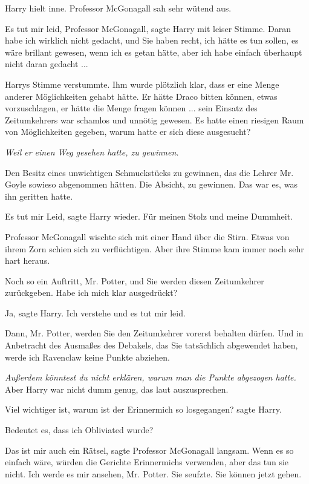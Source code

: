 Harry hielt inne. Professor McGonagall sah sehr wütend aus.

\glqq{}Es tut mir leid, Professor McGonagall\grqq{}, sagte Harry mit leiser
Stimme. \glqq{}Daran habe ich wirklich nicht gedacht, und Sie haben recht, ich
hätte es tun sollen, es wäre brillant gewesen, wenn ich es getan hätte, aber ich
habe einfach überhaupt nicht daran gedacht ...\grqq{}

Harrys Stimme verstummte. Ihm wurde plötzlich klar, dass er eine Menge anderer
Möglichkeiten gehabt hätte. Er hätte Draco bitten können, etwas vorzuschlagen,
er hätte die Menge fragen können ... sein Einsatz des Zeitumkehrers war schamlos
und unnötig gewesen. Es hatte einen riesigen Raum von Möglichkeiten gegeben,
warum hatte er sich diese ausgesucht?

\emph{Weil er einen Weg gesehen hatte, zu gewinnen.}

Den Besitz eines unwichtigen Schmuckstücks zu gewinnen, das die Lehrer Mr. Goyle
sowieso abgenommen hätten. Die Absicht, zu gewinnen. Das war es, was ihn
geritten hatte.

\glqq{}Es tut mir Leid\grqq{}, sagte Harry wieder. \glqq{}Für meinen Stolz und
meine Dummheit.\grqq{}

Professor McGonagall wischte sich mit einer Hand über die Stirn. Etwas von ihrem
Zorn schien sich zu verflüchtigen. Aber ihre Stimme kam immer noch sehr hart
heraus.

\glqq{}Noch so ein Auftritt, Mr. Potter, und Sie werden diesen Zeitumkehrer
zurückgeben. Habe ich mich klar ausgedrückt?\grqq{}

\glqq{}Ja\grqq{}, sagte Harry. \glqq{}Ich verstehe und es tut mir leid.\grqq{}

\glqq{}Dann, Mr. Potter, werden Sie den Zeitumkehrer vorerst behalten dürfen. Und
in Anbetracht des Ausmaßes des Debakels, das Sie tatsächlich abgewendet haben,
werde ich Ravenclaw keine Punkte abziehen.\grqq{}

\emph{Außerdem könntest du nicht erklären, warum man die Punkte abgezogen
hatte.} Aber Harry war nicht dumm genug, das laut auszusprechen.

\glqq{}Viel wichtiger ist, warum ist der Erinnermich so losgegangen?\grqq{} sagte
Harry.

\glqq{}Bedeutet es, dass ich Obliviated wurde?\grqq{}

\glqq{}Das ist mir auch ein Rätsel\grqq{}, sagte Professor McGonagall langsam.
\glqq{}Wenn es so einfach wäre, würden die Gerichte Erinnermichs verwenden, aber
das tun sie nicht. Ich werde es mir ansehen, Mr. Potter.\grqq{} Sie seufzte.
\glqq{}Sie können jetzt gehen.\grqq{}


